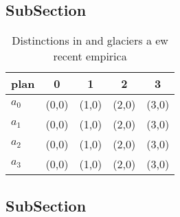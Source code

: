 \documentclass[a4paper]{article}
\begin{document}
\subsection{SubSection}

\begin{table}
\begin{adjustbox}{width=0.5\columnwidth}
\begin{tabular}{|l|l|l|l|l|}
\hline
\textbf{plan} & \multicolumn{1}{c|}{\textbf{0}} & \multicolumn{1}{c|}{\textbf{1}} & \multicolumn{1}{c|}{\textbf{2}} & \multicolumn{1}{c|}{\textbf{3}} \\ \hline
\textbf{$a_0$}  & (0,0) & (1,0) & (2,0) & (3,0) \\ \hline
\textbf{$a_1$}  & (0,0) & (1,0) & (2,0) & (3,0) \\ \hline
\textbf{$a_2$}  & (0,0) & (1,0) & (2,0) & (3,0) \\ \hline
\textbf{$a_3$}  & (0,0) & (1,0) & (2,0) & (3,0) \\ \hline
\end{tabular}
\end{adjustbox}
\caption{Distinctions in and glaciers a ew recent empirica
}
\end{table}

\subsection{SubSection}
\end{document}

